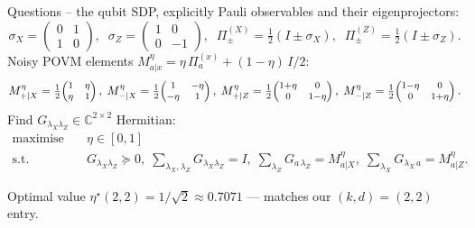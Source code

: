 \documentclass[10pt,aspectratio=169]{beamer}
\begin{document}
\begin{frame}{Questions -- the qubit SDP, explicitly}
  Pauli observables and their eigenprojectors:
  \[
    \sigma_X = \begin{pmatrix} 0 & 1 \\ 1 & 0 \end{pmatrix}, \;\;
    \sigma_Z = \begin{pmatrix} 1 & 0 \\ 0 & -1 \end{pmatrix}, \;\;
    \Pi^{(X)}_{\pm} = \tfrac{1}{2}(I \pm \sigma_X), \;\;
    \Pi^{(Z)}_{\pm} = \tfrac{1}{2}(I \pm \sigma_Z).
  \]
  Noisy POVM elements $M^{\eta}_{a|x} = \eta\,\Pi^{(x)}_a + (1-\eta)\,I/2$:
  \[
  \footnotesize
  M^{\eta}_{+|X} = \tfrac{1}{2}\!\begin{pmatrix} 1 & \eta \\ \eta & 1 \end{pmatrix},\;
  M^{\eta}_{-|X} = \tfrac{1}{2}\!\begin{pmatrix} 1 & -\eta \\ -\eta & 1 \end{pmatrix},\;
  M^{\eta}_{+|Z} = \tfrac{1}{2}\!\begin{pmatrix} 1{+}\eta & 0 \\ 0 & 1{-}\eta \end{pmatrix},\;
  M^{\eta}_{-|Z} = \tfrac{1}{2}\!\begin{pmatrix} 1{-}\eta & 0 \\ 0 & 1{+}\eta \end{pmatrix}.
  \]
  Find $G_{\lambda_X \lambda_Z} \in \mathbb{C}^{2 \times 2}$ Hermitian:
  \[
  \begin{aligned}
    \text{maximise} \quad & \eta \in [0, 1] \\
    \text{s.t.} \quad     & G_{\lambda_X \lambda_Z} \succeq 0,
                            \;
                            {\textstyle\sum_{\lambda_X, \lambda_Z}}
                            G_{\lambda_X \lambda_Z} = I, \;
                            {\textstyle\sum_{\lambda_Z}}
                            G_{a\, \lambda_Z} = M^{\eta}_{a|X}, \;
                            {\textstyle\sum_{\lambda_X}}
                            G_{\lambda_X\, a} = M^{\eta}_{a|Z}.
  \end{aligned}
  \]
  \begin{block}{Optimal value}
    $\eta^{\star}(2, 2) = 1/\sqrt 2 \approx 0.7071$ — matches our $(k, d) = (2, 2)$ entry.
  \end{block}
\end{frame}
\end{document}
